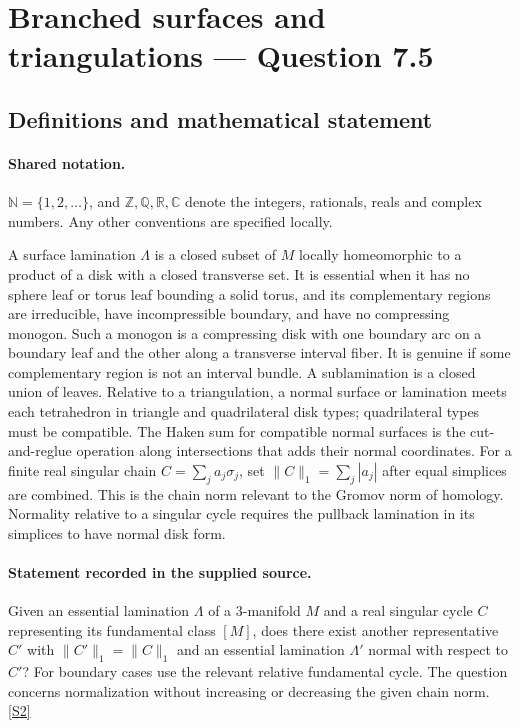 \documentclass[11pt]{article}
\newcommand{\sref}[2]{\hyperlink{source:#1:#2}{[S#2]}}
\begin{document}
\section{Branched surfaces and triangulations — Question 7.5}\label{statement}

\subsection{Definitions and mathematical statement}

\paragraph{Shared notation.}$\mathbb N=\{1,2,\ldots\}$, and $\mathbb Z,\mathbb Q,\mathbb R,\mathbb C$ denote the integers, rationals, reals and complex numbers. Any other conventions are specified locally.


A surface lamination $\Lambda$ is a closed subset of $M$ locally homeomorphic to a product of a disk with a closed transverse set. It is essential when it has no sphere leaf or torus leaf bounding a solid torus, and its complementary regions are irreducible, have incompressible boundary, and have no compressing monogon. Such a monogon is a compressing disk with one boundary arc on a boundary leaf and the other along a transverse interval fiber. It is genuine if some complementary region is not an interval bundle. A sublamination is a closed union of leaves. Relative to a triangulation, a normal surface or lamination meets each tetrahedron in triangle and quadrilateral disk types; quadrilateral types must be compatible. The Haken sum for compatible normal surfaces is the cut-and-reglue operation along intersections that adds their normal coordinates. For a finite real singular chain $C=\sum_j a_j\sigma_j$, set $\|C\|_1=\sum_j|a_j|$ after equal simplices are combined. This is the chain norm relevant to the Gromov norm of homology. Normality relative to a singular cycle requires the pullback lamination in its simplices to have normal disk form.
\paragraph{Statement recorded in the supplied source.}
Given an essential lamination $\Lambda$ of a $3$-manifold $M$ and a real singular cycle $C$ representing its fundamental class $[M]$, does there exist another representative $C'$ with $\|C'\|_1=\|C\|_1$ and an essential lamination $\Lambda'$ normal with respect to $C'$? For boundary cases use the relevant relative fundamental cycle. The question concerns normalization without increasing or decreasing the given chain norm. \sref{statement}{2}
\end{document}
